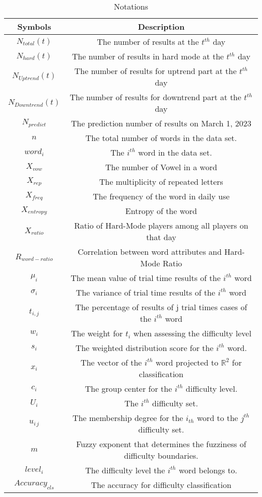 \begin{longtable}{cc}
	\caption{Notations} \\
	\toprule[2pt]
	Symbols        & Description   \\
	\midrule
	$N_{total}(t)$ & The number of results at the $t^{th}$ day\\
	$N_{hard}(t)$& The number of results in hard mode at the $t^{th}$ day\\
	$N_{Uptrend}(t)$&The number of results for uptrend part at the $t^{th}$ day\\
	$N_{Downtrend}(t)$&The number of results for downtrend part at the $t^{th}$ day\\
	$N_{predict}$&The prediction number of results on March 1, 2023\\
	$n$&The total number of words in the data set.\\
	$word_{i}$& The $i^{th}$ word in the data set.\\
	$X_{vow}$ & The number of Vowel in a word\\
	$X_{rep}$       & The multiplicity of repeated letters\\
	$X_{freq}$    & The  frequency of the word in daily use\\
	$X_{entropy}$      &  Entropy of the word\\
	$X_{ratio}$      &  Ratio of Hard-Mode players among all players on that day \\
	$R_{word-ratio}$& Correlation between word attributes and Hard-Mode Ratio\\
 $\mu_{i}$ & The mean value of trial time results of the $i^{th}$ word\\
 $\sigma_{i}$ &The variance of trial time results of the $i^{th}$ word\\
 $t_{i,j}$&The percentage of results of j trial times cases of the $i^{th}$ word\\
 $w_{i}$& The weight for $t_{i}$ when assessing the difficulty level\\
 $s_{i}$& The weighted distribution score for the $i^{th}$ word.\\
  $x_{i}$& The vector of the $i^{th}$ word projected to $\mathbb{R}^{2}$ for classification \\
  $c_{i}$& The group center for the $i^{th}$ difficulty level.\\
  $U_{i}$& The $i^{th}$ difficulty set.\\
  $u_{i\,j}$& The membership degree for the $i_{th}$ word to the $j^{th}$ difficulty set. \\
  $m$&Fuzzy exponent that determines the fuzziness of difficulty boundaries.\\
  $level_{i}$&The difficulty level the $i^{th}$ word belongs to.\\
  $Accuracy_{cls}$&The accuracy for difficulty classification\\
	\bottomrule[2pt]

\end{longtable}
\par 
